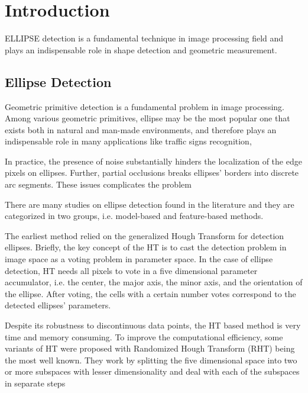 \documentclass[a4paper]{report}
\begin{document}
\section{Introduction}


ELLIPSE detection is a fundamental technique in image processing field and plays an indispensable role in shape
detection and geometric measurement.


\subsection{Ellipse Detection}
Geometric primitive detection is a fundamental problem in image processing. Among various geometric primitives, ellipse may be the most popular one that exists both in natural and man-made environments, and therefore plays an indispensable role in many applications like traffic signs recognition, 


In practice, the presence of noise substantially hinders the localization of the edge pixels on ellipses. Further, partial occlusions breaks ellipses' borders into discrete arc segments. These issues complicates the problem 

There are many studies on ellipse detection found in the literature and
they are categorized in two groups, i.e. model-based and feature-based methods.

The earliest method relied on the generalized Hough Transform for detection ellipses. Briefly,
the key concept of the HT is to cast the detection problem in image space as a voting problem in parameter space. 
In the case of ellipse detection, HT needs all pixels to vote in a five dimensional parameter accumulator, i.e. the center, the major axis, the minor axis, and the orientation of the ellipse. After voting, the cells with a certain number votes correspond to the detected ellipses' parameters.



Despite its robustness to discontinuous data points, the HT based method is very time and memory consuming. 
To improve the computational efficiency, some variants of HT were proposed with Randomized Hough Transform (RHT) being the most well known. They work by splitting the five dimensional space into two or more
subspaces with lesser dimensionality and deal with each of the
subspaces in separate steps
\end{document}
